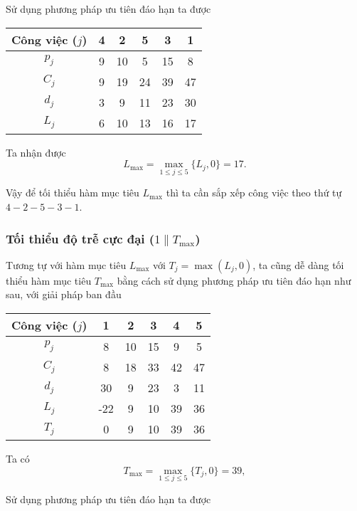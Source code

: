 \documentclass[12pt,a4paper]{report}
\begin{document}
Sử dụng phương pháp ưu tiên đáo hạn ta được

\begin{table}[h!]
	\centering
	\begin{tabular}{|c | c c c c c |} 
	\hline
	Công việc ($j$) & 4 & 2 & 5 & 3 & 1 \\
	\hline\hline
	$p_j$ & 9 & 10 & 5 & 15 & 8 \\
	$C_j$ & 9 & 19 & 24 & 39 & 47 \\
	$d_j$ & 3 & 9 & 11 & 23 & 30 \\
	$L_j$ & 6 & 10 & 13 & 16 & 17 \\
	\hline
	\end{tabular}
\end{table}

Ta nhận được
\begin{equation*}
	L_{\max} = \max _{1 \leq j \leq 5} \{L_j, 0\} = 17.
\end{equation*}

Vậy để tối thiểu hàm mục tiêu $L_{\max}$ thì ta cần sắp xếp công việc theo thứ tự $4-2-5-3-1$.

\subsubsection*{Tối thiểu độ trễ cực đại ($1 \| T_{\max}$)}
Tương tự với hàm mục tiêu $L_{\max}$ với $T_j=\max (L_j,0)$, ta cũng dễ dàng tối thiểu hàm mục tiêu $T_{\max}$ bằng cách sử dụng phương pháp ưu tiên đáo hạn như sau, với giải pháp ban đầu

\begin{table}[h!]
	\centering
	\begin{tabular}{|c | c c c c c |} 
	\hline
	Công việc ($j$) & 1 & 2 & 3 & 4 & 5 \\
	\hline\hline
	$p_j$ & 8 & 10 & 15 & 9 & 5 \\
	$C_j$ & 8 & 18 & 33 & 42 & 47 \\
	$d_j$ & 30 & 9 & 23 & 3 & 11 \\
	$L_j$ & -22 & 9 & 10 & 39 & 36 \\
	$T_j$ & 0 & 9 & 10 & 39 & 36 \\
	\hline
	\end{tabular}
\end{table}
Ta có
\begin{equation*}
	T_{\max} = \max _{1 \leq j \leq 5} \{T_j, 0\} = 39,
\end{equation*}

Sử dụng phương pháp ưu tiên đáo hạn ta được
\end{document}
